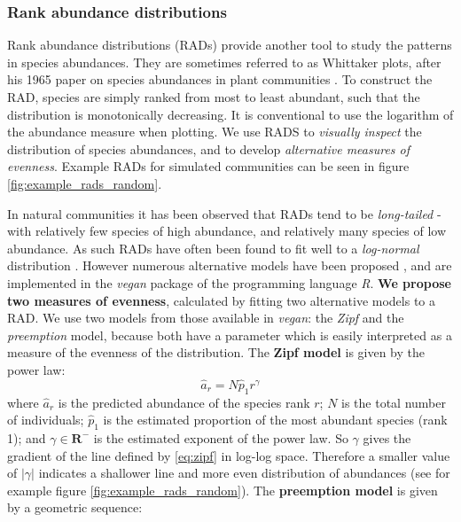 \subsubsection{Rank abundance distributions}
\label{sec:define_rads}

Rank abundance distributions (RADs) provide another tool to study the patterns in species abundances. They are sometimes referred to as Whittaker plots, after his 1965 paper on species abundances in plant communities \cite{whittaker1965dominance}. To construct the RAD, species are simply ranked from most to least abundant, such that the distribution is monotonically decreasing. It is conventional to use the logarithm of the abundance measure when plotting. We use RADS to \emph{visually inspect} the distribution of species abundances, and to develop \emph{alternative measures of evenness}. Example RADs for simulated communities can be seen in figure \ref{fig:example_rads_random}.

In natural communities it has been observed that RADs tend to be \emph{long-tailed} - with relatively few species of high abundance, and relatively many species of low abundance. As such RADs have often been found to fit well to a \emph{log-normal} distribution \cite{lurgi2015effects,whittaker1965dominance}. However numerous alternative models have been proposed \cite{wilson1991methods}, and are implemented in the \emph{vegan} package \cite{oksanen2007vegan} of the programming language \emph{R}. \textbf{We propose two measures of evenness}, calculated by fitting two alternative models to a RAD. We use two models from those available in \emph{vegan}: the \emph{Zipf} and the \emph{preemption} model, because both have a parameter which is easily interpreted as a measure of the evenness of the distribution. The \textbf{Zipf model} is given by the power law: 
\begin{equation}
\hat{a}_r = N\hat{p}_1r^{\gamma}
\label{eq:zipf}
\end{equation}
%
where $\hat{a}_r$ is the predicted abundance of the species rank $r$; $N$ is the total number of individuals; $\hat{p}_1$ is the estimated proportion of the most abundant species (rank 1); and $\gamma \in \mathbf{R}^-$ is the estimated exponent of the power law. So $\gamma$ gives the gradient of the line defined by \eqref{eq:zipf} in log-log space. Therefore a smaller value of $\left| \gamma \right|$ indicates a shallower line and more even distribution of abundances (see for example figure \ref{fig:example_rads_random}). The \textbf{preemption model} is given by a geometric sequence:

